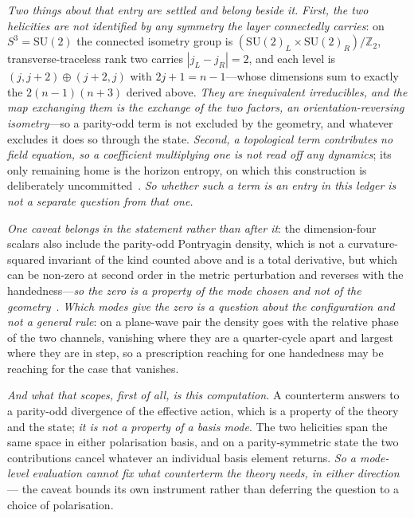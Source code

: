 \documentclass[11pt,a4paper]{article}
\theoremstyle{plain}
\theoremstyle{definition}
\theoremstyle{remark}
\begin{document}
\emph{Two things about that entry are settled and belong beside it.} \emph{First, the two helicities are
not identified by any symmetry the layer connectedly carries}: on $S^{3}=\mathrm{SU}(2)$ the connected
isometry group is $(\mathrm{SU}(2)_{L}\times\mathrm{SU}(2)_{R})/\mathbb{Z}_{2}$, transverse-traceless rank
two carries $|j_{L}-j_{R}|=2$, and each level is $(j,j+2)\oplus(j+2,j)$ with
$2j+1=n-1$---whose dimensions sum to exactly the $2(n-1)(n+3)$ derived
above. \emph{They are inequivalent
irreducibles, and the map exchanging them is the exchange of the two factors, an orientation-reversing
isometry}---so a parity-odd term is not excluded by the geometry, and whatever excludes it does so through
the state. \emph{Second, a topological term contributes no field equation, so a coefficient multiplying one
is not read off any dynamics}; its only remaining home is the horizon entropy, on which this construction is
deliberately uncommitted~\cite{JanzenGeometricCore}. \emph{So whether such a term is an entry in this ledger
is not a separate question from that one.}

\emph{One caveat belongs in the statement rather than after it}: the dimension-four scalars also include the
parity-odd Pontryagin density, which is not a curvature-squared invariant of the kind counted above
and is a total derivative, but which can be non-zero at second order in the
metric perturbation and reverses with the handedness---\emph{so the zero is a property of the mode chosen
and not of the geometry}~\cite{JanzenDynamics}. \emph{Which modes give the zero is a question about the
configuration and not a general rule}: on a plane-wave pair the density goes with the relative phase of the
two channels, vanishing where they are a quarter-cycle apart and largest where they are in step, so a
prescription reaching for one handedness may be reaching for the case that vanishes.

\emph{And what that scopes, first of all, is this computation.} A counterterm answers to a parity-odd
divergence of the effective action, which is a property of the theory and the state; \emph{it is not a
property of a basis mode}. The two helicities span the same space in either polarisation basis, and on a
parity-symmetric state the two contributions cancel whatever an individual basis element returns. \emph{So a
mode-level evaluation cannot fix what counterterm the theory needs, in either direction} --- the caveat
bounds its own instrument rather than deferring the question to a choice of polarisation.
\end{document}
